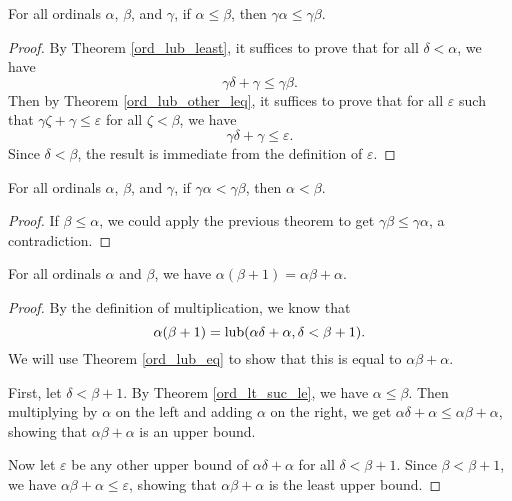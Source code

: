 \documentclass[../../math.tex]{subfiles}
\begin{document}
\begin{theorem} \label{ord_le_lmult}
    For all ordinals $\alpha$, $\beta$, and $\gamma$, if $\alpha \leq \beta$,
    then $\gamma\alpha \leq \gamma\beta$.
\end{theorem}
\begin{proof}
    By Theorem \ref{ord_lub_least}, it suffices to prove that for all $\delta <
    \alpha$, we have
    \[
        \gamma \delta + \gamma \leq \gamma \beta.
    \]
    Then by Theorem \ref{ord_lub_other_leq}, it suffices to prove that for all
    $\varepsilon$ such that $\gamma \zeta + \gamma \leq \varepsilon$ for all
    $\zeta < \beta$, we have
    \[
        \gamma\delta + \gamma \leq \varepsilon.
    \]
    Since $\delta < \beta$, the result is immediate from the definition of
    $\varepsilon$.
\end{proof}

\begin{theorem} \label{ord_lt_mult_lcancel}
    For all ordinals $\alpha$, $\beta$, and $\gamma$, if $\gamma \alpha < \gamma
    \beta$, then $\alpha < \beta$.
\end{theorem}
\begin{proof}
    If $\beta \leq \alpha$, we could apply the previous theorem to get $\gamma
    \beta \leq \gamma \alpha$, a contradiction.
\end{proof}

\begin{theorem} \label{ord_ldist_one}
    For all ordinals $\alpha$ and $\beta$, we have $\alpha(\beta + 1) =
    \alpha\beta + \alpha$.
\end{theorem}
\begin{proof}
    By the definition of multiplication, we know that
    \[
        \alpha(\beta + 1) = \operatorname{lub}(\alpha\delta + \alpha, \delta < \beta + 1).
    \]
    We will use Theorem \ref{ord_lub_eq} to show that this is equal to $\alpha
    \beta + \alpha$.

    First, let $\delta < \beta + 1$.  By Theorem \ref{ord_lt_suc_le}, we have
    $\alpha \leq \beta$.  Then multiplying by $\alpha$ on the left and adding
    $\alpha$ on the right, we get $\alpha\delta + \alpha \leq \alpha \beta +
    \alpha$, showing that $\alpha\beta + \alpha$ is an upper bound.

    Now let $\varepsilon$ be any other upper bound of $\alpha \delta + \alpha$
    for all $\delta < \beta + 1$.  Since $\beta < \beta + 1$, we have $\alpha
    \beta + \alpha \leq \varepsilon$, showing that $\alpha \beta + \alpha$ is
    the least upper bound.
\end{proof}
\end{document}
